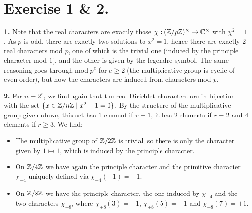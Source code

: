 \documentclass[a4paper,11pt]{article}
\begin{document}
\section*{Exercise 1 \& 2.}
\textbf{1.} Note that the real characters are exactly those $\chi:
(\mathbb{Z}/p\mathbb{Z})^\times \to \mathbb{C}^\times$  with $\chi^2 = 1$.
As $p$ is odd, there are exactly two solutions to $x^2=1$, hence there are exactly
$2$ real characters mod $p$, one of which is the trivial
one (induced by the principle character mod $1$), and the other is given by the 
legendre symbol. The same reasoning goes through mod $p^e$ for $e \geq 2$ (the
multiplicative group is cyclic of even order), but now the characters are
induced from characters mod $p$.

\textbf{2.}
For $n = 2^r$, we find again that the real Dirichlet characters are in
bijection with the set $\{x \in \mathbb{Z}/n\mathbb{Z} \mid x^2 -1 = 0\}$. By the structure of the 
multiplicative group given above, this set has $1$ element if $r=1$, it has $2$
elements if $r = 2$ and $4$ elements if $r \geq 3$. We find:
\begin{itemize}
    \item The multiplicative group of $\mathbb{Z}/2\mathbb{Z}$ is trivial, so there is only the
        character given by $1 \mapsto 1$, which is induced by the principle
        character. 
    \item On $\mathbb{Z}/4\mathbb{Z}$ we have again the principle character and the primitive
        character $\chi_{-4}$ uniquely defined via $\chi_{-4}(-1) = -1$.
    \item On $\mathbb{Z}/8\mathbb{Z}$ we have the principle character, the one induced by $\chi_{-4}$ 
        and the two characters $\chi_{\pm 8}$, where $\chi_{\pm 8}(3) = \mp 1$, 
        $\chi_{\pm 8}(5) = -1$ and $\chi_{\pm 8}(7) = \pm 1$. 
\end{itemize}
\end{document}
